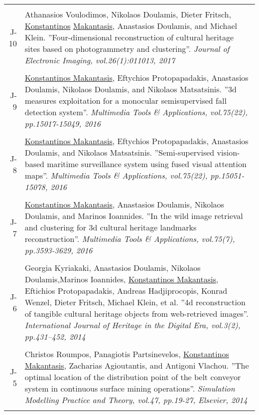 \documentclass[a4paper,10pt]{article}
\begin{document}
\begin{longtable}{r p{11cm}}
 \multicolumn{2}{c}{} \\
J-10 &\small{Athanasios Voulodimos, Nikolaos Doulamis, Dieter Fritsch, \underline{Konstantinos} \underline{Makantasis}, Anastasios Doulamis, and Michael Klein. ''Four-dimensional reconstruction of cultural heritage sites based on photogrammetry and clustering''. \textit{Journal of Electronic Imaging, vol.26(1):011013, 2017}}\\
 \multicolumn{2}{c}{} \\
J-9 &\small{\underline{Konstantinos Makantasis}, Eftychios Protopapadakis, Anastasios Doulamis, Nikolaos Doulamis, and Nikolaos Matsatsinis. ''3d measures exploitation for a monocular semisupervised fall detection system''. \textit{Multimedia Tools \& Applications, vol.75(22), pp.15017-15049, 2016}}\\
 \multicolumn{2}{c}{} \\
J-8 &\small{\underline{Konstantinos Makantasis}, Eftychios Protopapadakis, Anastasios Doulamis, and Nikolaos Matsatsinis. ''Semi-supervised vision-based maritime surveillance system using fused visual attention maps''. \textit{Multimedia Tools \& Applications, vol.75(22), pp.15051-15078, 2016}}\\
 \multicolumn{2}{c}{} \\
J-7 &\small{\underline{Konstantinos Makantasis}, Anastasios Doulamis, Nikolaos Doulamis, and Marinos Ioannides. ''In the wild image retrieval and clustering for 3d cultural heritage landmarks reconstruction''. \textit{Multimedia Tools \& Applications, vol.75(7), pp.3593-3629, 2016}}\\
 \multicolumn{2}{c}{} \\
J-6 &\small{Georgia Kyriakaki, Anastasios Doulamis, Nikolaos Doulamis,Marinos Ioannides, \underline{Konstantinos Makantasis}, Eftichios Protopapadakis, Andreas Hadjiprocopis, Konrad Wenzel, Dieter Fritsch, Michael Klein, et al. ''4d reconstruction of tangible cultural heritage objects from web-retrieved images''. \textit{International Journal of Heritage in the Digital Era, vol.3(2), pp.431–452, 2014}}\\
 \multicolumn{2}{c}{} \\
J-5 &\small{Christos Roumpos, Panagiotis Partsinevelos, \underline{Konstantinos Makantasis}, Zacharias Agioutantis, and Antigoni Vlachou. ''The optimal location of the distribution point of the belt conveyor system in continuous surface mining operations''. \textit{Simulation Modelling Practice and Theory, vol.47, pp.19-27, Elsevier, 2014}}\\
 \multicolumn{2}{c}{} \\

\end{longtable}
\end{document}
